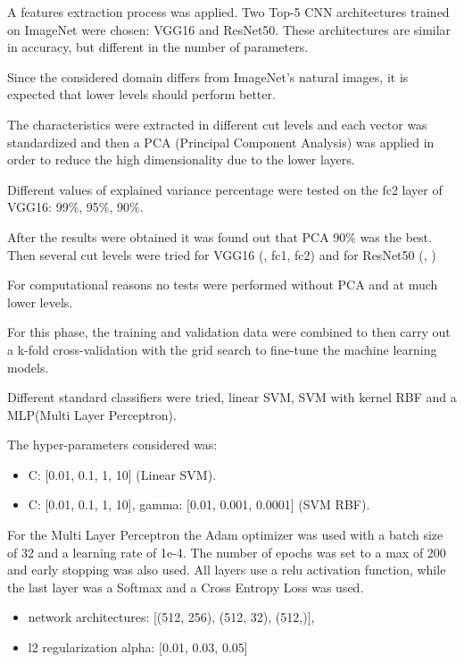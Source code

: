 A features extraction process was applied. Two Top-5 CNN architectures trained on ImageNet were chosen: VGG16 and ResNet50. These architectures are similar in accuracy, but different in the number of parameters.

Since the considered domain differs from ImageNet's natural images, it is expected that lower levels should perform better.

\vspace{5mm}
\noindent
The characteristics were extracted in different cut levels and each vector was standardized and then a PCA (Principal Component Analysis) was applied in order to reduce the high dimensionality due to the lower layers.

\noindent
Different values of explained variance percentage were tested on the fc2 layer of VGG16: 99\%, 95\%, 90\%.

\noindent
After the results were obtained it was found out that PCA 90\% was the best.
Then several cut levels were tried for VGG16 (, fc1, fc2) and for ResNet50 (, )

\noindent
For computational reasons no tests were performed without PCA and at much lower levels.

\vspace{5mm}
\noindent
For this phase, the training and validation data were combined to then carry out a k-fold cross-validation with the grid search to fine-tune the machine learning models.

\noindent
Different standard classifiers were tried, linear SVM, SVM with kernel RBF and a MLP(Multi Layer Perceptron).

\noindent
The hyper-parameters considered was:
\begin{itemize}
    \item C: [0.01, 0.1, 1, 10] (Linear SVM).
    \item C: [0.01, 0.1, 1, 10], gamma: [0.01, 0.001, 0.0001] (SVM RBF).
\end{itemize}

\noindent
For the Multi Layer Perceptron the Adam optimizer was used with a batch size of 32 and a learning rate of 1e-4. The number of epochs was set to a max of 200 and early stopping was also used.
All layers use a relu activation function, while the last layer was a Softmax and a Cross Entropy Loss was used.
\begin{itemize}
    \item network architectures: [(512, 256), (512, 32), (512,)],
    \item l2 regularization alpha: [0.01, 0.03, 0.05]
\end{itemize}
